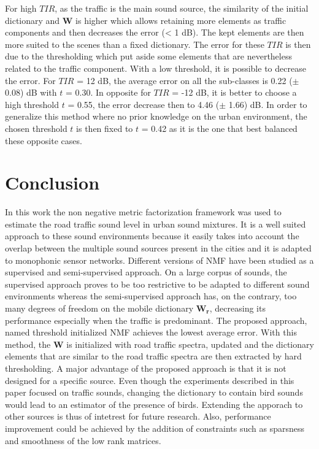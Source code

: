 \documentclass[twocolumn,a4paper,10pt]{article}
\begin{document}
For high $TIR$, as the traffic is the main sound source, the similarity of the initial dictionary and $\mathbf{W}$ is higher which allows retaining more elements as traffic components and then decreases the error (< 1 dB). The kept elements are then more suited to the scenes than a fixed dictionary. The error for these $TIR$ is then due to the thresholding which put aside some elements that are nevertheless related to the traffic component. With a low threshold, it is possible to decrease the error. For $TIR$ = 12 dB, the average error on all the sub-classes is 0.22 ($\pm$ 0.08) dB with $t$ = 0.30. In opposite for $TIR$ = -12 dB, it is better to choose a high threshold $t$ = 0.55, the error decrease then to 4.46 ($\pm$ 1.66) dB. In order to generalize this method where no prior knowledge on the urban environment, the chosen threshold $t$ is then fixed to $t$ = 0.42 as it is the one that best balanced these opposite cases.

\section{Conclusion}

In this work the non negative metric factorization framework  was used to estimate the road traffic sound level in urban sound mixtures. It is a well suited approach to these sound environments because it easily takes into account the overlap between the multiple sound sources present in the cities and it is adapted to monophonic sensor networks. Different versions of NMF have been studied as a supervised and semi-supervised approach. On a large corpus of sounds, the supervised approach proves to be too restrictive to be adapted to different sound environments whereas the semi-supervised approach has, on the contrary, too many degrees of freedom on the mobile dictionary $\mathbf{W_r}$, decreasing its performance especially when the traffic is predominant. The proposed approach, named threshold initialized NMF achieves the lowest average error. With this method, the $\mathbf{W}$ is initialized with road traffic spectra, updated and the dictionary elements that are similar to the road traffic spectra are then extracted by hard thresholding.
A major advantage of the proposed approach is that it is not designed for a specific source. Even though the experiments described in this paper focused on traffic sounds, changing the dictionary to contain bird sounds would lead to an estimator of the presence of birds. Extending the apporach to other sources is thus of intetrest for future research. Also, performance improvement could be achieved by the addition of constraints such as sparsness \cite{hoyer2004non} and smoothness \cite{virtanen_monaural_2007} of the low rank matrices.
\end{document}
